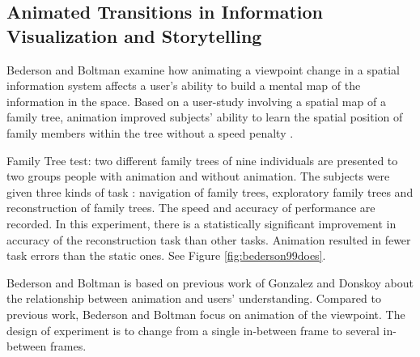 \documentclass{egpubl}
\begin{document}
\subsection{Animated Transitions in Information Visualization and Storytelling}
Bederson and Boltman examine how animating a viewpoint change in a spatial information system affects a user's ability to build a mental map of the information in the space. Based on a user-study involving a spatial map of a family tree, animation improved subjects' ability to learn the spatial position of family members within the tree without a speed penalty \cite{bedrson}.

Family Tree test: two different family trees of nine individuals are presented to two groups people with animation and without animation. The subjects were given three kinds of task : navigation of family trees, exploratory family trees and reconstruction of family trees. The speed and accuracy of performance are recorded. In this experiment, there is a statistically significant improvement in accuracy of the reconstruction task than other tasks. Animation resulted in fewer task errors than the static ones. See Figure \ref{fig:bederson99does}.

Bederson and Boltman is based on previous work of Gonzalez \cite{gonzalez} and Donskoy \cite{donskoy} about the relationship between animation and users' understanding. Compared to previous work, Bederson and Boltman focus on animation of the viewpoint. The design of experiment is to change from a single in-between frame to several in-between frames.
\end{document}
